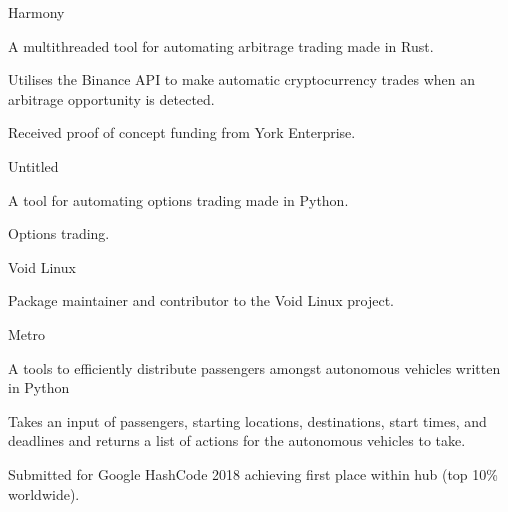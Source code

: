 
\begin{cventries}
  \cventry
    {} %
    {Harmony} %
    {} %
    {} %
    {
      \begin{cvitems} %
        \item {A multithreaded tool for automating arbitrage trading made in Rust.}
        \vspace{0.5mm}
		\item {Utilises the Binance API to make automatic cryptocurrency trades when an arbitrage opportunity is detected.}
		\vspace{0.5mm}
		\item {Received proof of concept funding from York Enterprise.}
      \end{cvitems}
    }

  \cventry
    {} %
    {Untitled} %
    {} %
    {} %
    {
      \begin{cvitems} %
        \item {A tool for automating options trading made in Python.}
        \vspace{0.5mm}
		\item {Options trading.}
      \end{cvitems}
    }

  \cventry
    {} %
    {Void Linux} %
    {} %
    {} %
    {
      \begin{cvitems} %
      	\item {Package maintainer and contributor to the Void Linux project.}
      \end{cvitems}
    }

  \cventry
    {} %
    {Metro} %
    {} %
    {} %
    {
      \begin{cvitems} %
      	\item {A tools to efficiently distribute passengers amongst autonomous vehicles written in Python}
      	\vspace{0.5mm}
		\item {Takes an input of passengers, starting locations, destinations, start times, and deadlines and returns a list of actions for the autonomous vehicles to take.}
		\vspace{0.5mm}
		\item {Submitted for Google HashCode 2018 achieving first place within hub (top 10\% worldwide).}
      \end{cvitems}
    }
\end{cventries}